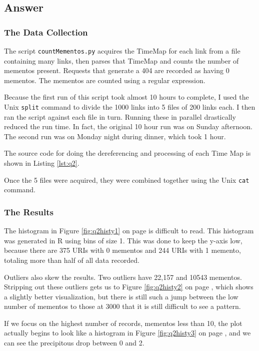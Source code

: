 \documentclass[letterpaper,11pt]{article}
\begin{document}
\newpage
\subsection*{Answer}

\subsubsection*{The Data Collection}
The script \verb+countMementos.py+ acquires the TimeMap for each link from a file containing many links, then parses that TimeMap and counts the number of mementos present.  Requests that generate a 404 are recorded as having 0 mementos.  The mementos are counted using a regular expression.

Because the first run of this script took almost 10 hours to complete, I used the Unix \verb+split+ command to divide the 1000 links into 5 files of 200 links each.  I then ran the script against each file in turn.  Running these in parallel drastically reduced the run time.  In fact, the original 10 hour run was on Sunday afternoon.  The second run was on Monday night during dinner, which took 1 hour.

The source code for doing the dereferencing and processing of each Time Map is shown in Listing \ref{lst:q2}.

Once the 5 files were acquired, they were combined together using the Unix \verb+cat+ command.

\subsubsection*{The Results}

The histogram in Figure \ref{fig:q2histy1} on page \pageref{fig:q2histy1} is difficult to read.  This histogram was generated in R using bins of size 1.  This was done to keep the y-axis low, because there are 375 URIs with 0 mementos and 244 URIs with 1 memento, totaling more than half of all data recorded.

Outliers also skew the results.  Two outliers have 22,157 and 10543 mementos.  Stripping out these outliers gets us to Figure \ref{fig:q2histy2} on page \pageref{fig:q2histy2}, which shows a slightly better visualization, but there is still such a jump between the low number of mementos to those at 3000 that it is still difficult to see a pattern.

If we focus on the highest number of records, mementos less than 10, the plot actually begins to look like a histogram in Figure \ref{fig:q2histy3} on page \pageref{fig:q2histy3}, and we can see the precipitous drop between 0 and 2.
\end{document}

